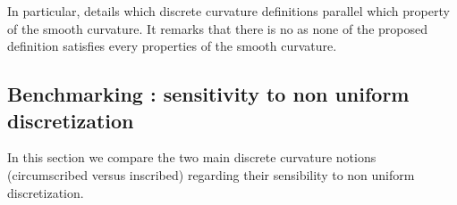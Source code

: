 In particular, \cite{Vouga2014} details which discrete curvature definitions parallel which property of the smooth curvature. It remarks that there is no  as none of the proposed definition satisfies every properties of the smooth curvature.

%







\subsection{Benchmarking : sensitivity to non uniform discretization}
In this section we compare the two main discrete curvature notions (circumscribed versus inscribed) regarding their sensibility to non uniform discretization.

